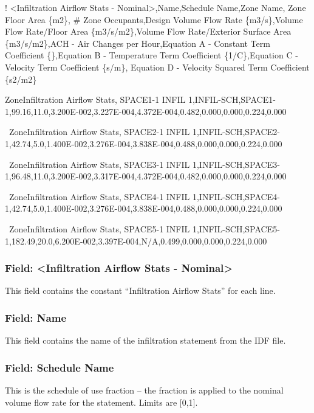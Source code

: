! \textless{}Infiltration Airflow Stats - Nominal\textgreater{},Name,Schedule Name,Zone Name, Zone Floor Area \{m2\}, \# Zone Occupants,Design Volume Flow Rate \{m3/s\},Volume Flow Rate/Floor Area \{m3/s/m2\},Volume Flow Rate/Exterior Surface Area \{m3/s/m2\},ACH - Air Changes per Hour,Equation A - Constant Term Coefficient \{\},Equation B - Temperature Term Coefficient \{1/C\},Equation C - Velocity Term Coefficient \{s/m\}, Equation D - Velocity Squared Term Coefficient \{s2/m2\}

ZoneInfiltration Airflow Stats, SPACE1-1 INFIL 1,INFIL-SCH,SPACE1-1,99.16,11.0,3.200E-002,3.227E-004,4.372E-004,0.482,0.000,0.000,0.224,0.000

~ZoneInfiltration Airflow Stats, SPACE2-1 INFIL 1,INFIL-SCH,SPACE2-1,42.74,5.0,1.400E-002,3.276E-004,3.838E-004,0.488,0.000,0.000,0.224,0.000

~ZoneInfiltration Airflow Stats, SPACE3-1 INFIL 1,INFIL-SCH,SPACE3-1,96.48,11.0,3.200E-002,3.317E-004,4.372E-004,0.482,0.000,0.000,0.224,0.000

~ZoneInfiltration Airflow Stats, SPACE4-1 INFIL 1,INFIL-SCH,SPACE4-1,42.74,5.0,1.400E-002,3.276E-004,3.838E-004,0.488,0.000,0.000,0.224,0.000

~ZoneInfiltration Airflow Stats, SPACE5-1 INFIL 1,INFIL-SCH,SPACE5-1,182.49,20.0,6.200E-002,3.397E-004,N/A,0.499,0.000,0.000,0.224,0.000

\subsubsection{Field: \textless{}Infiltration Airflow Stats - Nominal\textgreater{}}\label{field-infiltration-airflow-stats---nominal}

This field contains the constant ``Infiltration Airflow Stats'' for each line.

\subsubsection{Field: Name}\label{field-name-6}

This field contains the name of the infiltration statement from the IDF file.

\subsubsection{Field: Schedule Name}\label{field-schedule-name-5}

This is the schedule of use fraction -- the fraction is applied to the nominal volume flow rate for the statement. Limits are {[}0,1{]}.

